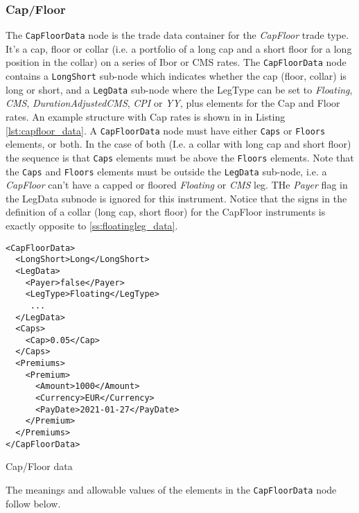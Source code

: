 \subsubsection{Cap/Floor}
\label{ss:capfloor}

The \lstinline!CapFloorData! node is the trade data container for the \emph{CapFloor} trade type.  It's a cap, floor or collar
(i.e. a portfolio of a long cap and a short floor for a long position in the collar) on a series of Ibor or CMS rates. The
\lstinline!CapFloorData! node contains a \lstinline!LongShort! sub-node which indicates whether the cap (floor, collar)
is long or short, and a \lstinline!LegData!  sub-node where the
LegType can be set to \emph{Floating}, \emph{CMS}, \emph{DurationAdjustedCMS}, \emph{CPI}
or \emph{YY}, plus elements for the Cap and Floor rates. An example structure with Cap rates is shown in in Listing
\ref{lst:capfloor_data}. A \lstinline!CapFloorData! node must have either \lstinline!Caps! or \lstinline!Floors!
elements, or both. In the case of both (I.e. a collar with long cap and short floor) the sequence is that  \lstinline!Caps! elements must be above the \lstinline!Floors! elements. Note that 
the \lstinline!Caps! and \lstinline!Floors! elements must be outside the \lstinline!LegData! sub-node, i.e. a \emph{CapFloor} 
can't have a capped or floored  \emph{Floating}  or \emph{CMS} leg.
THe \emph{Payer} flag in the LegData subnode is ignored for this instrument. Notice that the signs in the definition of a collar (long cap, short floor) for the CapFloor
instruments is exactly opposite to \ref{ss:floatingleg_data}.

\begin{listing}[H]
\begin{verbatim}
<CapFloorData>
  <LongShort>Long</LongShort>
  <LegData>
    <Payer>false</Payer>
    <LegType>Floating</LegType>
     ...
  </LegData>
  <Caps>
    <Cap>0.05</Cap>
  </Caps>
  <Premiums>
    <Premium>
      <Amount>1000</Amount>
      <Currency>EUR</Currency>
      <PayDate>2021-01-27</PayDate>
    </Premium>
  </Premiums>
</CapFloorData>
\end{verbatim}
\caption{Cap/Floor data}
\label{lst:capfloor_data}
\end{listing}

The meanings and allowable values of the elements in the \lstinline!CapFloorData!  node follow below.

